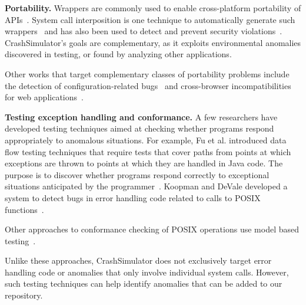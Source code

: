 \noindent
{\bf Portability.}
Wrappers are commonly used to enable cross-platform portability of
APIs~\cite{bartolomeicompliance}. System call interposition is one
technique to automatically generate such
wrappers~\cite{Guo:2011:CUS:2002181.2002202} and has also been used to
detect and prevent security
violations~\cite{Hofmeyr:1998:IDU:1298081.1298084,
Acharya:2000:MUP:1251306.1251307}.  CrashSimulator's goals are
complementary, as it exploits environmental anomalies discovered in
testing, or found by analyzing other applications.

Other works that target complementary classes of portability problems
include the detection of configuration-related bugs~\cite{skoll:icse:2004,
Yilmaz:issta:2004, Fouche:issta:2009, Kastner12, Nguyen14} and
cross-browser incompatibilities for web
applications~\cite{DBLP:conf/icsm/ChoudharyVO10, silakov2010improving,
DBLP:conf/icse/Choudhary11, Mesbah:2011:ACC:1985793.1985870,
DBLP:conf/icst/DallmeierP0MZ14}.


\noindent
{\bf Testing exception handling and conformance.}
A few researchers have developed testing techniques aimed at checking
whether programs respond appropriately to anomalous situations.  For
example, Fu et al. introduced data flow testing techniques that require
tests that cover paths from points at which exceptions are thrown to points
at which they are handled in Java code. The purpose is to discover whether
programs respond correctly to exceptional situations anticipated by the
programmer~\cite{DBLP:journals/tse/FuMRW05}.  Koopman and DeVale developed
a system to detect bugs in error handling code related to calls to POSIX
functions~\cite{Koopman00theexception}.

Other approaches to conformance checking of POSIX operations use model
based testing~\cite{Dadeau:2008:CSM:1433121.1433137,Farchi02}.

Unlike these approaches, CrashSimulator does not exclusively target error
handling code or anomalies that only involve individual system calls.
However, such testing techniques can help identify anomalies that can be
added to our repository.


